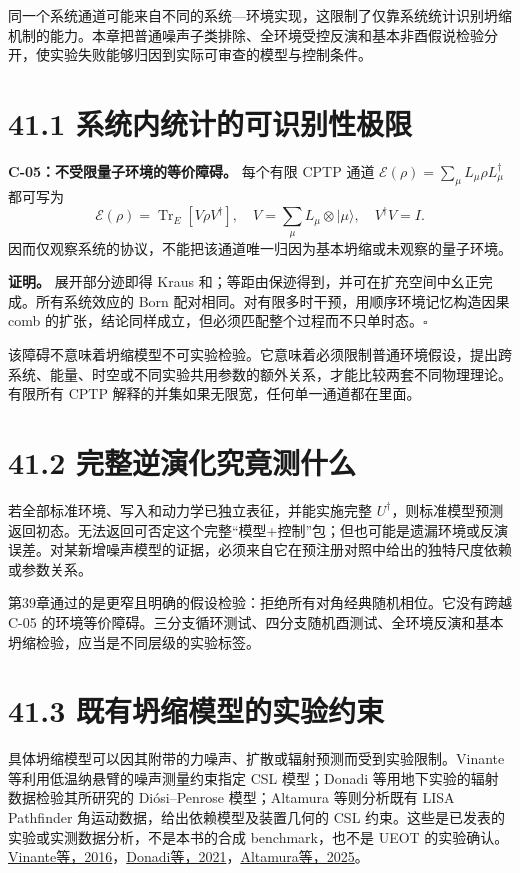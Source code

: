 \documentclass[
  11pt,
  oneside]{book}
\begin{document}
同一个系统通道可能来自不同的系统---环境实现，这限制了仅靠系统统计识别坍缩机制的能力。本章把普通噪声子类排除、全环境受控反演和基本非酉假说检验分开，使实验失败能够归因到实际可审查的模型与控制条件。

\section{41.1 系统内统计的可识别性极限}

\protect\hypertarget{c-05}{}{}

\textbf{C-05：不受限量子环境的等价障碍。} 每个有限 CPTP 通道
\(\mathcal E(\rho)=\sum_\mu L_\mu\rho L_\mu^\dagger\) 都可写为 \[
\mathcal E(\rho)=\operatorname{Tr}_E[V\rho V^\dagger],
\quad V=\sum_\mu L_\mu\otimes|\mu\rangle,\quad V^\dagger V=I.
\tag{41.1}
\]
因而仅观察系统的协议，不能把该通道唯一归因为基本坍缩或未观察的量子环境。

\textbf{证明。} 展开部分迹即得 Kraus
和；等距由保迹得到，并可在扩充空间中幺正完成。所有系统效应的 Born
配对相同。对有限多时干预，用顺序环境记忆构造因果 comb
的扩张，结论同样成立，但必须匹配整个过程而不只单时态。\(\square\)

该障碍不意味着坍缩模型不可实验检验。它意味着必须限制普通环境假设，提出跨系统、能量、时空或不同实验共用参数的额外关系，才能比较两套不同物理理论。有限所有
CPTP 解释的并集如果无限宽，任何单一通道都在里面。

\section{41.2 完整逆演化究竟测什么}

若全部标准环境、写入和动力学已独立表征，并能实施完整
\(U^\dagger\)，则标准模型预测返回初态。无法返回可否定这个完整``模型+控制''包；但也可能是遗漏环境或反演误差。对某新增噪声模型的证据，必须来自它在预注册对照中给出的独特尺度依赖或参数关系。

第39章通过的是更窄且明确的假设检验：拒绝所有对角经典随机相位。它没有跨越
C-05
的环境等价障碍。三分支循环测试、四分支随机酉测试、全环境反演和基本坍缩检验，应当是不同层级的实验标签。

\section{41.3 既有坍缩模型的实验约束}

具体坍缩模型可以因其附带的力噪声、扩散或辐射预测而受到实验限制。Vinante
等利用低温纳悬臂的噪声测量约束指定 CSL 模型；Donadi
等用地下实验的辐射数据检验其所研究的 Diósi--Penrose 模型；Altamura
等则分析既有 LISA Pathfinder 角运动数据，给出依赖模型及装置几何的 CSL
约束。这些是已发表的实验或实测数据分析，不是本书的合成 benchmark，也不是
UEOT
的实验确认。\href{https://doi.org/10.1103/PhysRevLett.116.090402}{Vinante等，2016}，\href{https://doi.org/10.1038/s41567-020-1008-4}{Donadi等，2021}，\href{https://doi.org/10.1103/PhysRevA.111.L020203}{Altamura等，2025}。
\end{document}
